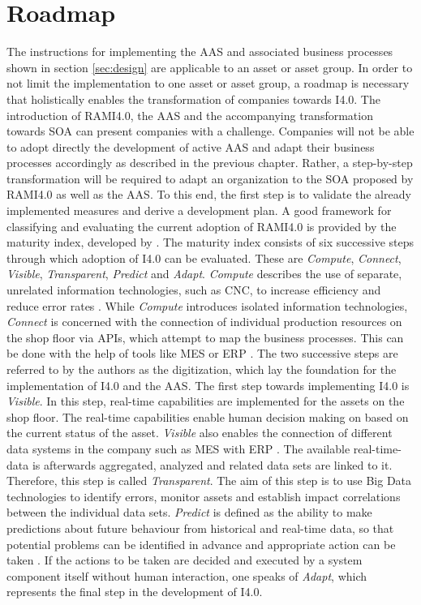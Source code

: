 \section{Roadmap}
The instructions for implementing the \ac{AAS} and associated business processes shown in section \ref{sec:design} are applicable to an asset or asset group. In order to not limit the implementation to one asset or asset group, a roadmap is necessary that holistically enables the transformation of companies towards \ac{I4.0}. The introduction of \ac{RAMI4.0}, the \ac{AAS} and the accompanying transformation towards \ac{SOA} can present companies with a challenge. Companies will not be able to adopt directly the development of active \ac{AAS} and adapt their business processes accordingly as described in the previous chapter. Rather, a step-by-step transformation will be required to adapt an organization to the \ac{SOA} proposed by \ac{RAMI4.0} as well as the \ac{AAS}. To this end, the first step is to validate the already implemented measures and derive a development plan. A good framework for classifying and evaluating the current adoption of \ac{RAMI4.0} is provided by the maturity index, developed by \cite[p. 15]{Schuh2020IndustrieAcatech}. The maturity index consists of six successive steps through which adoption of \ac{I4.0} can be evaluated. These are \textit{Compute}, \textit{Connect}, \textit{Visible}, \textit{Transparent}, \textit{Predict} and \textit{Adapt}. \textit{Compute} describes the use of separate, unrelated information technologies, such as \ac{CNC}, to increase efficiency and reduce error rates \cite[p. 15]{Schuh2020IndustrieAcatech}. While \textit{Compute} introduces isolated information technologies, \textit{Connect} is concerned with the connection of individual production resources on the shop floor via \ac{API}s, which attempt to map the business processes. This can be done with the help of tools like \ac{MES} or \ac{ERP} \cite[p. 16]{Schuh2020IndustrieAcatech}. The two successive steps are referred to by the authors as the digitization, which lay the foundation for the implementation of \ac{I4.0} and the \ac{AAS}. The first step towards implementing \ac{I4.0} is \textit{Visible}. In this step, real-time capabilities are implemented for the assets on the shop floor. The real-time capabilities enable human decision making on based on the current status of the asset. \textit{Visible} also enables the connection of different data systems in the company such as \ac{MES} with \ac{ERP} \cite[p. 17]{Schuh2020IndustrieAcatech}. The available real-time-data is afterwards aggregated, analyzed and related data sets are linked to it. Therefore, this step is called \textit{Transparent}. The aim of this step is to use Big Data technologies to identify errors, monitor assets and establish impact correlations between the individual data sets. \textit{Predict} is defined as the ability to make predictions about future behaviour from historical and real-time data, so that potential problems can be identified in advance and appropriate action can be taken \cite[p. 19]{Schuh2020IndustrieAcatech}. If the actions to be taken are decided and executed by a system component itself without human interaction, one speaks of \textit{Adapt}, which represents the final step in the development of \ac{I4.0}. 


